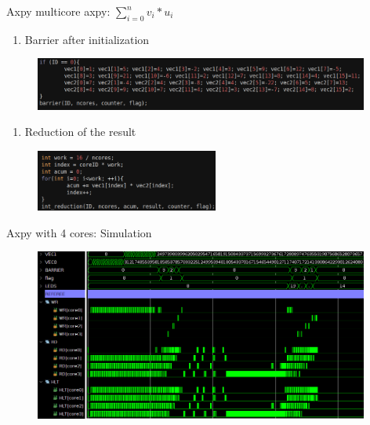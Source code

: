 \begin{frame}{Axpy multicore}
axpy: $\sum_{i=0}^{n}{v_{i} * u_{i}}$
\vspace{0.2cm}
\begin{enumerate}
    \item Barrier after initialization
\end{enumerate}
\begin{figure}
    \centering
    \includegraphics[width=11cm]{images/axpy_ini.png}
    \label{fig:my_label}
\end{figure}

\begin{enumerate}
    \item Reduction of the result
\end{enumerate}
\begin{figure}
    \centering
    \includegraphics[width=6cm]{images/axpy_body.png}
    \label{fig:my_label}
\end{figure}


\end{frame}

\begin{frame}{Axpy with 4 cores: Simulation}
\begin{figure}
    \centering
    \includegraphics[width=11cm]{images/axpy_sim4_crop.png}
    \label{fig:my_label}
\end{figure}
\end{frame}

